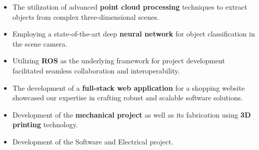 \documentclass[10pt,a4paper]{altacv}
\begin{document}

\begin{itemize}
\item The utilization of advanced \textbf{point cloud processing} techniques to extract objects from complex three-dimensional scenes.
\item Employing a state-of-the-art deep \textbf{neural network} for object classification in the scene camera.
\item Utilizing \textbf{ROS} as the underlying framework for project development facilitated seamless collaboration and interoperability.
\end{itemize}
\medskip
\divider

\begin{itemize}
    \item The development of a \textbf{full-stack web application}  for a shopping website showcased our expertise in crafting robust and scalable software solutions.
\end{itemize}
\divider
\medskip

\begin{itemize}
    \item Development of the \textbf{mechanical project} as well as its fabrication using \textbf{3D printing} technology.
    \item Development of the Software and Electrical project.
\end{itemize}
\divider



\clearpage




\end{document}
